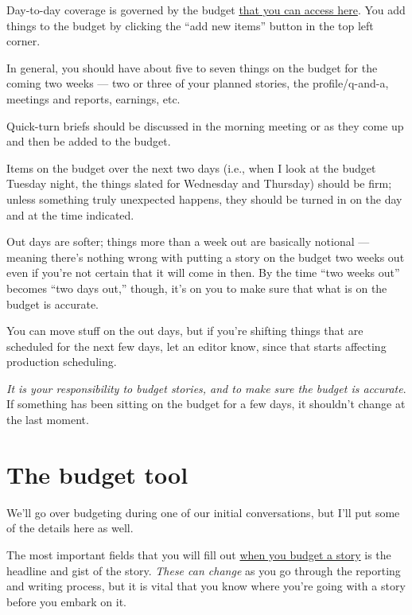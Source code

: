 \documentclass[
  11pt,
  american,
  letterpaperpaper,
  extrafontsizes,onecolumn,openright
  ]{memoir}
\begin{document}
Day-to-day coverage is governed by the budget \href{https://acbj-my.sharepoint.com/personal/tgibbons_bizjournals_com/Lists/JBJ\%20Planning\%203}{that you can access here}. You add things to the budget by clicking the \enquote{add new items} button in the top left corner.

In general, you should have about five to seven things on the budget for the coming two weeks --- two or three of your planned stories, the profile/q-and-a, meetings and reports, earnings, etc.

Quick-turn briefs should be discussed in the morning meeting or as they come up and then be added to the budget.

Items on the budget over the next two days (i.e., when I look at the budget Tuesday night, the things slated for Wednesday and Thursday) should be firm; unless something truly unexpected happens, they should be turned in on the day and at the time indicated.

Out days are softer; things more than a week out are basically notional --- meaning there's nothing wrong with putting a story on the budget two weeks out even if you're not certain that it will come in then. By the time \enquote{two weeks out} becomes \enquote{two days out,} though, it's on you to make sure that what is on the budget is accurate.

You can move stuff on the out days, but if you're shifting things that are scheduled for the next few days, let an editor know, since that starts affecting production scheduling.

\emph{It is your responsibility to budget stories, and to make sure the budget is accurate}. If something has been sitting on the budget for a few days, it shouldn't change at the last moment.

\hypertarget{the-budget-tool}{%
\section*{The budget tool}\label{the-budget-tool}}

We'll go over budgeting during one of our initial conversations, but I'll put some of the details here as well.

The most important fields that you will fill out \href{https://acbj-my.sharepoint.com/personal/tgibbons_bizjournals_com/Lists/JBJ\%20Planning\%203?viewid=a1fb1466-c5cc-4f2e-b860-514cf8dbd979\&env=WebViewList}{when you budget a story} is the headline and gist of the story. \emph{These can change} as you go through the reporting and writing process, but it is vital that you know where you're going with a story before you embark on it.
\end{document}
